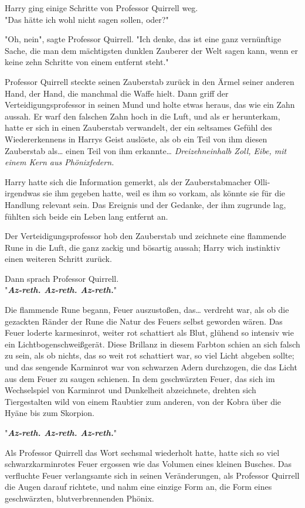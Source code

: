 {Harry ging einige Schritte von Professor Quirrell weg.\\ "Das hätte ich wohl nicht sagen sollen, oder?"

"Oh, nein", sagte Professor Quirrell. "Ich denke, das ist eine ganz vernünftige Sache, die man dem mächtigsten dunklen Zauberer der Welt sagen kann, wenn er keine zehn Schritte von einem entfernt steht."

Professor Quirrell steckte seinen Zauberstab zurück in den Ärmel seiner anderen Hand, der Hand, die manchmal die Waffe hielt. Dann griff der Verteidigungsprofessor in seinen Mund und holte etwas heraus, das wie ein Zahn aussah. Er warf den falschen Zahn hoch in die Luft, und als er herunterkam, hatte er sich in einen Zauberstab verwandelt, der ein seltsames Gefühl des Wiedererkennens in Harrys Geist auslöste, als ob ein Teil von ihm diesen Zauberstab als… einen Teil von ihm erkannte… \emph{Dreizehneinhalb Zoll, Eibe, mit einem Kern aus Phönixfedern.}

Harry hatte sich die Information gemerkt, als der Zauberstabmacher Olli-irgendwas sie ihm gegeben hatte, weil es ihm so vorkam, als könnte sie für die Handlung relevant sein. Das Ereignis und der Gedanke, der ihm zugrunde lag, fühlten sich beide ein Leben lang entfernt an.

Der Verteidigungsprofessor hob den Zauberstab und zeichnete eine flammende Rune in die Luft, die ganz zackig und bösartig aussah; Harry wich instinktiv einen weiteren Schritt zurück.

Dann sprach Professor Quirrell.\\ "\textbf{\emph{Az-reth. Az-reth. Az-reth.}}"

Die flammende Rune begann, Feuer auszustoßen, das… verdreht war, als ob die gezackten Ränder der Rune die Natur des Feuers selbst geworden wären. Das Feuer loderte karmesinrot, weiter rot schattiert als Blut, glühend so intensiv wie ein Lichtbogenschweißgerät. Diese Brillanz in diesem Farbton schien an sich falsch zu sein, als ob nichts, das so weit rot schattiert war, so viel Licht abgeben sollte; und das sengende Karminrot war von schwarzen Adern durchzogen, die das Licht aus dem Feuer zu saugen schienen. In dem geschwärzten Feuer, das sich im Wechselspiel von Karminrot und Dunkelheit abzeichnete, drehten sich Tiergestalten wild von einem Raubtier zum anderen, von der Kobra über die Hyäne bis zum Skorpion.

"\textbf{\emph{Az-reth. Az-reth. Az-reth.}}"

Als Professor Quirrell das Wort sechsmal wiederholt hatte, hatte sich so viel schwarzkarminrotes Feuer ergossen wie das Volumen eines kleinen Busches. Das verfluchte Feuer verlangsamte sich in seinen Veränderungen, als Professor Quirrell die Augen darauf richtete, und nahm eine einzige Form an, die Form eines geschwärzten, blutverbrennenden Phönix.

}
